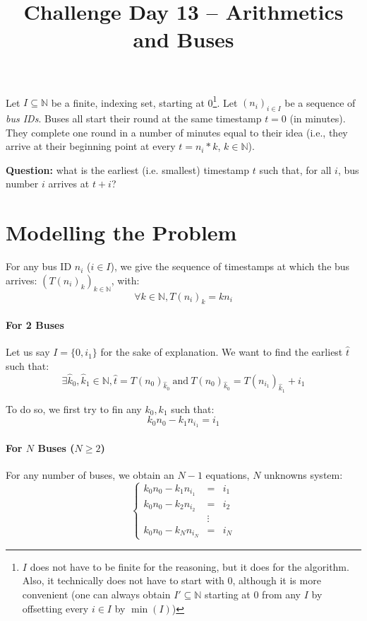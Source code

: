 \documentclass{article}
\title{Challenge Day 13 -- Arithmetics and Buses}
\author{}
\date{}
\begin{document}
\maketitle

Let $I \subseteq \mathbb{N}$ be a finite, indexing set, starting at 0\footnote{$I$ does not have to be finite for the reasoning, but it does for the algorithm. Also, it technically does not have to start with 0, although it is more convenient (one can always obtain $I' \subseteq \mathbb{N}$ starting at 0 from any $I$ by offsetting every $i \in I$ by $\min(I)$)}. Let $(n_i)_{i\in I}$ be a sequence of \textit{bus IDs}. Buses all start their round at the same timestamp $t = 0$ (in minutes). They complete one round in a number of minutes equal to their idea (i.e., they arrive at their beginning point at every $t = n_i * k$, $k \in \mathbb{N}$).

\medskip

\noindent\textbf{Question:} what is the earliest (i.e. smallest) timestamp $t$ such that, for all $i$, bus number $i$ arrives at $t + i$?


\section{Modelling the Problem}

For any bus ID $n_i$ ($i \in I$), we give the sequence of timestamps at which the bus arrives: $(T(n_i)_k)_{k \in \mathbb{N}}$, with:
$$\forall k \in \mathbb{N}, T(n_i)_k = k n_i$$

\paragraph{For 2 Buses} Let us say $I = \{0, i_1\}$ for the sake of explanation. We want to find the earliest $\hat t$ such that:
$$\exists \hat k_0, \hat k_1 \in \mathbb{N}, \hat t = T(n_0)_{\hat k_0} \ \mathrm{and}\ T(n_0)_{\hat k_0} = T(n_{i_1})_{\hat k_1} + i_1$$

To do so, we first try to fin any $k_0, k_1$ such that:
\begin{equation}\label{eqn:2buses}
k_0 n_0 - k_1 n_{i_1} = i_1
\end{equation}

\paragraph{For $N$ Buses ($N \geq 2$)} For any number of buses, we obtain an $N-1$ equations, $N$ unknowns system:
\begin{equation}\label{eqn:nbuses}
\left\{\begin{array}{lcl}
k_0 n_0 - k_1 n_{i_1} & = & i_1 \\
k_0 n_0 - k_2 n_{i_2} & = & i_2 \\
& \vdots & \\
k_0 n_0 - k_N n_{i_N} & = & i_N
\end{array}\right.
\end{equation}
\end{document}
